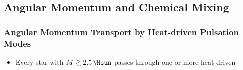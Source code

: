 
\subsection{Angular Momentum and Chemical Mixing}


{\color{brown}
\subsubsection{Angular Momentum Transport by Heat-driven Pulsation Modes}

\begin{itemize}
\item Every star with $M \gtrsim 2.5\,\Msun$ passes through one or more heat-driven
\end{itemize}


}


